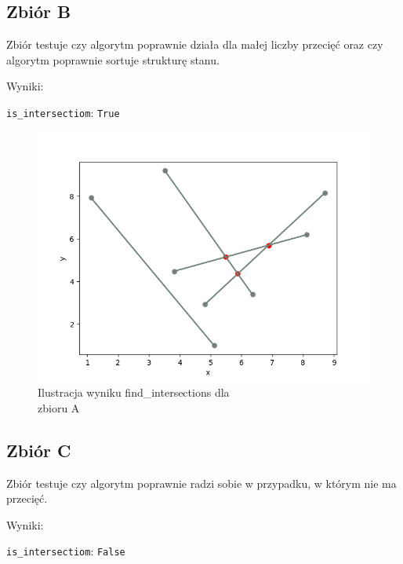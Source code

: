 \documentclass[11pt,a4paper]{article}
\begin{document}
\subsection{Zbiór B}
Zbiór testuje czy algorytm poprawnie działa dla małej
liczby przecięć oraz czy algorytm poprawnie sortuje strukturę
stanu.

Wyniki:

\verb|is_intersectiom|: \verb|True|

\begin{figure}[H]
    \centering
    \includegraphics[scale=0.5]{res/int_b.png}
    \caption{Ilustracja wyniku \ttfamily find\_intersections \normalfont dla \\zbioru A}
\end{figure}

\subsection{Zbiór C}
Zbiór testuje czy algorytm poprawnie radzi sobie w przypadku,
w którym nie ma przecięć.

Wyniki:

\verb|is_intersectiom|: \verb|False|
\end{document}
